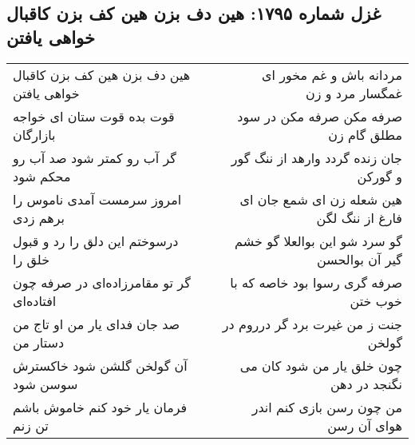 \begin{center}
\section*{غزل شماره ۱۷۹۵: هین دف بزن هین کف بزن کاقبال خواهی یافتن}
\label{sec:1795}
\begin{longtable}{l p{0.5cm} r}
هین دف بزن هین کف بزن کاقبال خواهی یافتن
&&
مردانه باش و غم مخور ای غمگسار مرد و زن
\\
قوت بده قوت ستان ای خواجه بازارگان
&&
صرفه مکن صرفه مکن در سود مطلق گام زن
\\
گر آب رو کمتر شود صد آب رو محکم شود
&&
جان زنده گردد وارهد از ننگ گور و گورکن
\\
امروز سرمست آمدی ناموس را برهم زدی
&&
هین شعله زن ای شمع جان ای فارغ از ننگ لگن
\\
درسوختم این دلق را رد و قبول خلق را
&&
گو سرد شو این بوالعلا گو خشم گیر آن بوالحسن
\\
گر تو مقامرزاده‌ای در صرفه چون افتاده‌ای
&&
صرفه گری رسوا بود خاصه که با خوب ختن
\\
صد جان فدای یار من او تاج من دستار من
&&
جنت ز من غیرت برد گر درروم در گولخن
\\
آن گولخن گلشن شود خاکسترش سوسن شود
&&
چون خلق یار من شود کان می نگنجد در دهن
\\
فرمان یار خود کنم خاموش باشم تن زنم
&&
من چون رسن بازی کنم اندر هوای آن رسن
\\
\end{longtable}
\end{center}
